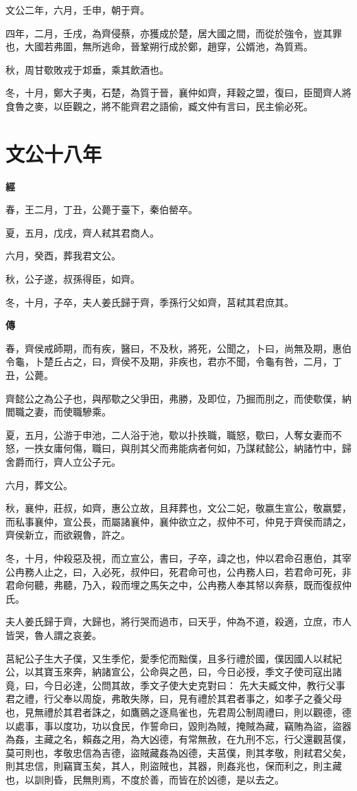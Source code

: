 \documentclass{ctexart}
\begin{document}
文公二年，六月，壬申，朝于齊。

四年，二月，壬戌，為齊侵蔡，亦獲成於楚，居大國之間，而從於強令，豈其罪也，大國若弗圖，無所逃命，晉鞏朔行成於鄭，趙穿，公婿池，為質焉。

秋，周甘歜敗戎于邥垂，乘其飲酒也。

冬，十月，鄭大子夷，石楚，為質于晉，襄仲如齊，拜穀之盟，復曰，臣聞齊人將食魯之麥，以臣觀之，將不能齊君之語偷，臧文仲有言曰，民主偷必死。





\section{文公十八年}


\textbf{經}



春，王二月，丁丑，公薨于臺下，秦伯罃卒。

夏，五月，戊戌，齊人弒其君商人。

六月，癸酉，葬我君文公。

秋，公子遂，叔孫得臣，如齊。

冬，十月，子卒，夫人姜氏歸于齊，季孫行父如齊，莒弒其君庶其。

\textbf{傳}



春，齊侯戒師期，而有疾，醫曰，不及秋，將死，公聞之，卜曰，尚無及期，惠伯令龜，卜楚丘占之，曰，齊侯不及期，非疾也，君亦不聞，令龜有咎，二月，丁丑，公薨。

齊懿公之為公子也，與邴歜之父爭田，弗勝，及即位，乃掘而刖之，而使歜僕，納閻職之妻，而使職驂乘。

夏，五月，公游于申池，二人浴于池，歜以扑抶職，職怒，歜曰，人奪女妻而不怒，一抶女庸何傷，職曰，與刖其父而弗能病者何如，乃謀弒懿公，納諸竹中，歸舍爵而行，齊人立公子元。

六月，葬文公。

秋，襄仲，莊叔，如齊，惠公立故，且拜葬也，文公二妃，敬嬴生宣公，敬嬴嬖，而私事襄仲，宣公長，而屬諸襄仲，襄仲欲立之，叔仲不可，仲見于齊侯而請之，齊侯新立，而欲親魯，許之。

冬，十月，仲殺惡及視，而立宣公，書曰，子卒，諱之也，仲以君命召惠伯，其宰公冉務人止之，曰，入必死，叔仲曰，死君命可也，公冉務人曰，若君命可死，非君命何聽，弗聽，乃入，殺而埋之馬矢之中，公冉務人奉其帑以奔蔡，既而復叔仲氏。

夫人姜氏歸于齊，大歸也，將行哭而過市，曰天乎，仲為不道，殺適，立庶，市人皆哭，魯人謂之哀姜。

莒紀公子生大子僕，又生季佗，愛季佗而黜僕，且多行禮於國，僕因國人以弒紀公，以其寶玉來奔，納諸宣公，公命與之邑，曰，今日必授，季文子使司寇出諸竟，曰，今日必達，公問其故，季文子使大史克對曰：
先大夫臧文仲，教行父事君之禮，行父奉以周旋，弗敢失隊，曰，見有禮於其君者事之，如孝子之養父母也，見無禮於其君者誅之，如鷹鸇之逐鳥雀也，先君周公制周禮曰，則以觀德，德以處事，事以度功，功以食民，作誓命曰，毀則為賊，掩賊為藏，竊賄為盜，盜器為姦，主藏之名，賴姦之用，為大凶德，有常無赦，在九刑不忘，行父還觀莒僕，莫可則也，孝敬忠信為吉德，盜賊藏姦為凶德，夫莒僕，則其孝敬，則弒君父矣，則其忠信，則竊寶玉矣，其人，則盜賊也，其器，則姦兆也，保而利之，則主藏也，以訓則昏，民無則焉，不度於善，而皆在於凶德，是以去之。
\end{document}
